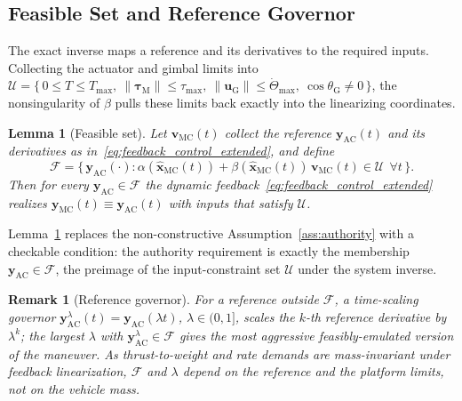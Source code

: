 \documentclass[letterpaper, 10 pt, conference]{ieeeconf}  %
\newtheorem{lemma}{Lemma}
\newtheorem{remark}{Remark}
\begin{document}
\subsection{Feasible Set and Reference Governor}
\label{ssec:feasible}
The exact inverse maps a reference and its derivatives to the required inputs. Collecting the actuator and gimbal limits into $\mathcal{U} = \{\, 0 \le T \le T_\text{max},\ \|\boldsymbol{\tau}_\text{M}\| \le \tau_\text{max},\ \|\mathbf{u}_\text{G}\| \le \dot\Theta_\text{max},\ \cos\theta_\text{G} \neq 0 \,\}$, the nonsingularity of $\beta$ pulls these limits back exactly into the linearizing coordinates.

\begin{lemma}[Feasible set]
\label{lem:feasible}
Let $\mathbf{v}_\text{MC}(t)$ collect the reference $\mathbf{y}_\text{AC}(t)$ and its derivatives as in~\eqref{eq:feedback_control_extended}, and define
\begin{equation}
\label{eq:feasible_set}
\mathcal{F} = \big\{\, \mathbf{y}_\text{AC}(\cdot) : \alpha(\hat{\mathbf{x}}_\text{MC}(t)) + \beta(\hat{\mathbf{x}}_\text{MC}(t))\,\mathbf{v}_\text{MC}(t) \in \mathcal{U}\ \ \forall t \,\big\}.
\end{equation}
Then for every $\mathbf{y}_\text{AC} \in \mathcal{F}$ the dynamic feedback~\eqref{eq:feedback_control_extended} realizes $\mathbf{y}_\text{MC}(t) \equiv \mathbf{y}_\text{AC}(t)$ with inputs that satisfy $\mathcal{U}$.
\end{lemma}

Lemma~\ref{lem:feasible} replaces the non-constructive Assumption~\ref{ass:authority} with a checkable condition: the authority requirement is exactly the membership $\mathbf{y}_\text{AC} \in \mathcal{F}$, the preimage of the input-constraint set $\mathcal{U}$ under the system inverse.

\begin{remark}[Reference governor]
For a reference outside $\mathcal{F}$, a time-scaling governor $\mathbf{y}_\text{AC}^{\lambda}(t) = \mathbf{y}_\text{AC}(\lambda t)$, $\lambda \in (0,1]$, scales the $k$-th reference derivative by $\lambda^{k}$; the largest $\lambda$ with $\mathbf{y}_\text{AC}^{\lambda} \in \mathcal{F}$ gives the most aggressive feasibly-emulated version of the maneuver. As thrust-to-weight and rate demands are mass-invariant under feedback linearization, $\mathcal{F}$ and $\lambda$ depend on the reference and the platform limits, not on the vehicle mass.
\end{remark}
\end{document}
